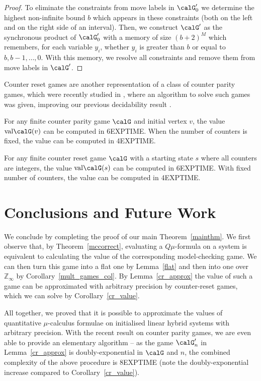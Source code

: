 \documentclass[fleqn,envcountsame]{LMCS}
\newcommand{\val}{\ensuremath{\mathrm{val}}}
\newcommand{\Qmu}{\ensuremath{Q\mu}\xspace}
\newcommand{\Zinf}{\ensuremath{\mathbb{Z}_{\infty}}}
\begin{document}
\begin{proof}
To eliminate the constraints from move labels in $\calG'_0$ we
determine the highest non-infinite bound $b$ which appears in these
constraints (both on the left and on the right side of an interval).
Then, we construct $\calG'$ as the synchronous product of $\calG'_0$
with a memory of size $(b+2)^M$ which remembers, for each variable $y_i$,
whether $y_i$ is greater than $b$ or equal to $b, b-1, \ldots, 0$. With
this memory, we resolve all constraints and remove them from move labels
in $\calG'$.
\end{proof}

Counter reset games are another representation of a class of counter parity
games, which were recently studied in \cite{BKL12}, where an algorithm to solve
such games was given, improving our previous decidability result \cite{FK11}.

\begin{thm}
For any finite counter parity game $\calG$ and initial vertex $v$,
the value $\val \calG(v)$ can be computed in \textsc{6EXPTIME}.
When the number of counters is fixed, the value can be computed
in \textsc{4EXPTIME}.
\end{thm}

\begin{cor} \label{cr_value}
For any finite counter reset game $\calG$ with a starting state $s$ where all
counters are integers, the value $\val \calG(s)$ can be computed in
\textsc{6EXPTIME}. With fixed number of counters, the value
can be computed in \textsc{4EXPTIME}.
\end{cor}


\section{Conclusions and Future Work}

We conclude by completing the proof of our main Theorem~\ref{mainthm}.
We first observe that, by Theorem~\ref{mccorrect}, evaluating a
\Qmu-formula on a system is equivalent to calculating the value of the 
corresponding model-checking game. We can then turn this game into a
flat one by Lemma~\ref{flat} and then into one over $\Zinf$ by
Corollary~\ref{mult_games_col}.
By Lemma~\ref{cr_approx} the value of such a game can be approximated
with arbitrary precision by counter-reset games, which we can solve
by Corollary~\ref{cr_value}.

All together, we proved that it is possible to approximate the values
of quantitative $\mu$-calculus formulae on initialised linear hybrid
systems with arbitrary precision. With the recent result on counter parity
games, we are even able to provide an elementary algorithm -- as the game
$\calG'_n$ in Lemma~\ref{cr_approx} is doubly-exponential in $\calG$ and $n$,
the combined complexity of the above procedure is \textsc{8EXPTIME}
(note the doubly-exponential increase compared to Corollary~\ref{cr_value}).
\end{document}
